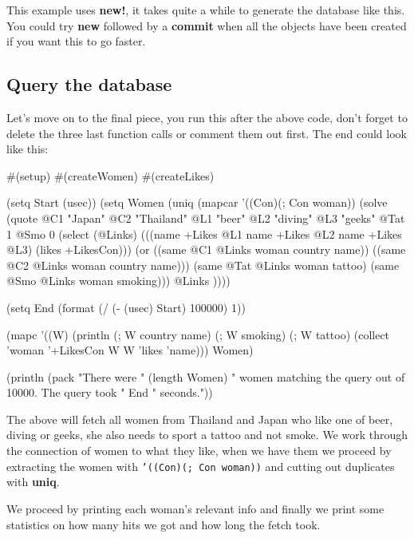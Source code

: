 This example uses \textbf{new!}, it takes quite a while to generate
the database like this. You could try \textbf{new} followed by a
\textbf{commit} when all the objects have been created if you want
this to go faster.


\subsection{Query the database}
\label{sec:prolog-dat-aid-query-the-database}

Let's move on to the final piece, you run this after the above code,
don't forget to delete the three last function calls or comment them out
first. The end could look like this:


\begin{wideverbatim}
#(setup)
#(createWomen)
#(createLikes)

(setq Start (usec))
(setq Women
   (uniq 
      (mapcar '((Con)(; Con woman)) 
         (solve   
            (quote
               @C1 "Japan"
               @C2 "Thailand"
               @L1 "beer"         
               @L2 "diving"         
               @L3 "geeks"         
               @Tat 1
               @Smo 0
               (select (@Links)  
                  (((name +Likes @L1 name +Likes @L2 name +Likes @L3) (likes +LikesCon)))
                  (or
                     ((same @C1 @Links woman country name))
                     ((same @C2 @Links woman country name)))
                  (same @Tat @Links woman tattoo)
                  (same @Smo @Links woman smoking)))   
            @Links ))))
    
(setq End (format (/ (- (usec) Start) 100000) 1))

(mapc 
   '((W)
       (println 
          (; W country name)           
          (; W smoking)          
          (; W tattoo)          
          (collect 'woman '+LikesCon W W 'likes 'name))) Women)
    
(println 
   (pack 
      "There were " 
      (length Women) 
      " women matching the query out of 10000. The query took " 
      End 
      " seconds."))
\end{wideverbatim}

The above will fetch all women from Thailand and Japan who like one of
beer, diving or geeks, she also needs to sport a tattoo and not smoke.
We work through the connection of women to what they like, when we
have them we proceed by extracting the women with \texttt{'((Con)(;
  Con woman))} and cutting out duplicates with \textbf{uniq}.

We proceed by printing each woman's relevant info and finally we print
some statistics on how many hits we got and how long the fetch took.

